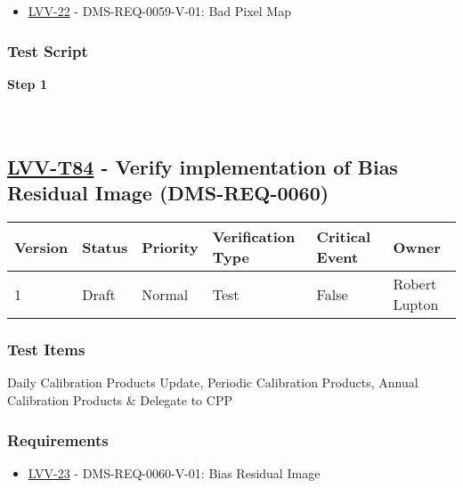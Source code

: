 \begin{itemize}
\tightlist
\item
  \href{https://jira.lsstcorp.org/browse/LVV-22}{LVV-22} -
  DMS-REQ-0059-V-01: Bad Pixel Map
\end{itemize}

\hypertarget{test-script-173}{%
\subsubsection{Test Script}\label{test-script-173}}

\textbf{Step 1}\\
~\\
~\\

\hypertarget{lvv-t84---verify-implementation-of-bias-residual-image-dms-req-0060}{%
\subsection{\texorpdfstring{\href{https://jira.lsstcorp.org/secure/Tests.jspa\#/testCase/LVV-T84}{LVV-T84}
- Verify implementation of Bias Residual Image
(DMS-REQ-0060)}{LVV-T84 - Verify implementation of Bias Residual Image (DMS-REQ-0060)}}\label{lvv-t84---verify-implementation-of-bias-residual-image-dms-req-0060}}

\begin{longtable}[]{@{}llllll@{}}
\toprule
Version & Status & Priority & Verification Type & Critical Event &
Owner\tabularnewline
\midrule
\endhead
1 & Draft & Normal & Test & False & Robert Lupton\tabularnewline
\bottomrule
\end{longtable}

\hypertarget{test-items-173}{%
\subsubsection{Test Items}\label{test-items-173}}

Daily Calibration Products Update, Periodic Calibration Products, Annual
Calibration Products \& Delegate to CPP

\hypertarget{requirements-174}{%
\subsubsection{Requirements}\label{requirements-174}}

\begin{itemize}
\tightlist
\item
  \href{https://jira.lsstcorp.org/browse/LVV-23}{LVV-23} -
  DMS-REQ-0060-V-01: Bias Residual Image
\end{itemize}


